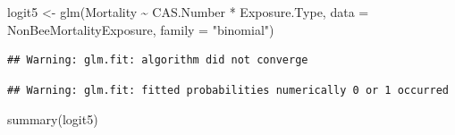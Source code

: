 \documentclass[
  12pt,
]{article}
\newenvironment{Shaded}{\begin{snugshade}}{\end{snugshade}}
\newcommand{\AttributeTok}[1]{\textcolor[rgb]{0.77,0.63,0.00}{#1}}
\newcommand{\FunctionTok}[1]{\textcolor[rgb]{0.00,0.00,0.00}{#1}}
\newcommand{\NormalTok}[1]{#1}
\newcommand{\OtherTok}[1]{\textcolor[rgb]{0.56,0.35,0.01}{#1}}
\newcommand{\SpecialCharTok}[1]{\textcolor[rgb]{0.00,0.00,0.00}{#1}}
\newcommand{\StringTok}[1]{\textcolor[rgb]{0.31,0.60,0.02}{#1}}
\begin{document}
\begin{Shaded}
\begin{Highlighting}[]
\NormalTok{logit5 }\OtherTok{\textless{}{-}} \FunctionTok{glm}\NormalTok{(Mortality }\SpecialCharTok{\textasciitilde{}}\NormalTok{ CAS.Number }\SpecialCharTok{*}\NormalTok{ Exposure.Type, }\AttributeTok{data =}\NormalTok{ NonBeeMortalityExposure, }\AttributeTok{family =} \StringTok{"binomial"}\NormalTok{)}
\end{Highlighting}
\end{Shaded}

\begin{verbatim}
## Warning: glm.fit: algorithm did not converge
\end{verbatim}

\begin{verbatim}
## Warning: glm.fit: fitted probabilities numerically 0 or 1 occurred
\end{verbatim}

\begin{Shaded}
\begin{Highlighting}[]
\FunctionTok{summary}\NormalTok{(logit5)}
\end{Highlighting}
\end{Shaded}
\end{document}
